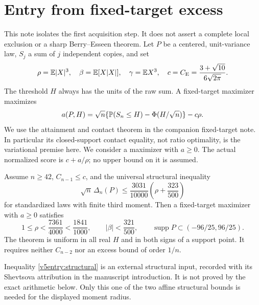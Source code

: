 \section{Entry from fixed-target excess}
\label{v5entry:section}

This note isolates the first acquisition step. It does not assert a complete
local exclusion or a sharp Berry--Esseen theorem. Let $P$ be a centered,
unit-variance law, $S_j$ a sum of $j$ independent copies, and set
\[
 \rho=\mathbb E|X|^3,\quad \beta=\mathbb E[X|X|],\quad \gamma=\mathbb E X^3,
 \quad c=C_{\mathrm E}=\frac{3+\sqrt{10}}{6\sqrt{2\pi}}.
\]
The threshold $H$ always has the units of the raw sum. A fixed-target
maximizer maximizes
\[
 a(P,H)=\sqrt n\{\mathbb P(S_n\le H)-\Phi(H/\sqrt n)\}-c\rho.
\]
We use the attainment and contact theorem in the companion fixed-target
note. In particular its closed-support contact
equality, not ratio optimality, is the variational premise here. We consider
a maximizer with $a\ge0$. The actual normalized score is $c+a/\rho$;
no upper bound on it is assumed.

\begin{theorem}\label{v5entry:initial}
Assume $n\ge42$, $C_{n-1}\le c$, and the universal structural inequality
\begin{equation}\label{v5entry:structural}
 \sqrt n\,\Delta_n(P)\le\frac{3031}{10000}
                  \left(\rho+\frac{323}{500}\right)
\end{equation}
for standardized laws with finite third moment. Then a fixed-target
maximizer with $a\ge0$ satisfies
\begin{equation}\label{v5entry:entry}
 1\le\rho<\frac{7361}{4000}<\frac{1841}{1000},\qquad
 |\beta|<\frac{321}{500},\qquad
 \operatorname{supp}P\subset(-96/25,96/25).
\end{equation}
The theorem is uniform in all real $H$ and in both signs of a support
point. It requires neither $C_{n-2}$ nor an excess bound of order $1/n$.
\end{theorem}

Inequality \eqref{v5entry:structural} is an external structural input,
recorded with its Shevtsova attribution in the manuscript introduction.
It is not proved by the exact arithmetic below. Only this one of the
two affine structural bounds is needed for the displayed moment radius.

